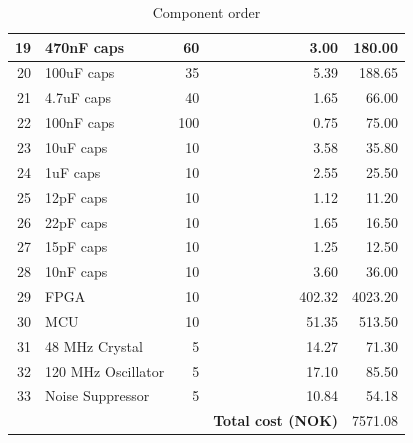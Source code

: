 \documentclass[../main/report.tex]{subfiles}
\begin{document}
\begin{table}[H]
{\begin{minipage}{\textwidth}
\begin{tabular}{| r | l | r | r | r |}
        19  &   470nF caps          & 60    & 3.00      & 180.00            \\\hline
        20  &   100uF caps          & 35    & 5.39      & 188.65            \\\hline
        21  &   4.7uF caps          & 40    & 1.65      & 66.00             \\\hline
        22  &   100nF caps          & 100   & 0.75      & 75.00             \\\hline
        23  &   10uF caps           & 10    & 3.58      & 35.80             \\\hline
        24  &   1uF caps            & 10    & 2.55      & 25.50             \\\hline
        25  &   12pF caps           & 10    & 1.12      & 11.20             \\\hline
        26  &   22pF caps           & 10    & 1.65      & 16.50             \\\hline
        27  &   15pF caps           & 10    & 1.25      & 12.50             \\\hline
        28  &   10nF caps           & 10    & 3.60      & 36.00             \\\hline
        29  &   FPGA                & 10    & 402.32    & 4023.20           \\\hline
        30  &   MCU                 & 10    & 51.35     & 513.50            \\\hline
        31  &   48 MHz Crystal      & 5     & 14.27     & 71.30             \\\hline
        32  &   120 MHz Oscillator  & 5     & 17.10     & 85.50             \\\hline
        33  &   Noise Suppressor    & 5     & 10.84     & 54.18             \\\hline
        \hline
        & &                 & \textbf{Total cost (NOK)} & 7571.08           \\\hline
    \end{tabular}
    \label{fig:component-order}
    \caption{Component order}
    \end{minipage}}
\end{table}
\end{document}
